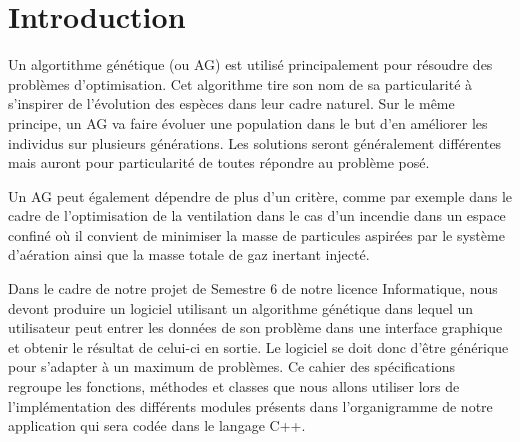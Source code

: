 \documentclass[a4paper,11pt]{article}
\title{\vspace{13em}{\huge Cahier des Spécifications}}
\author{Edouard Fouassier - Maxime Gonthier - Benjamin Guillot\\
		Laureline Martin - Rémi Navarro - Lydia Rodrigez de la Nava
		\vspace{2em}\\
		Algorithme Génétique
		\vspace{2em}}
\begin{document}
	
	\clearpage
	\maketitle\vspace{13em}
\newpage
\tableofcontents
\newpage\clearpage{}
	
	\section{Introduction}
		Un algortithme génétique (ou AG) est utilisé principalement pour résoudre des problèmes d’optimisation. 
		Cet algorithme tire son nom de sa particularité à s’inspirer de l’évolution des espèces dans leur cadre naturel.
		Sur le même principe, un AG va faire évoluer une population dans le but d’en améliorer les individus sur plusieurs générations.
		Les solutions seront généralement différentes mais auront pour particularité de toutes répondre au problème posé.

		Un AG peut également dépendre de plus d'un critère, comme par exemple dans le cadre de l'optimisation de la ventilation dans le cas d’un incendie dans un espace confiné où il convient de minimiser la masse de particules aspirées par le système d'aération ainsi que la masse totale de gaz inertant injecté.

		Dans le cadre de notre projet de Semestre 6 de notre licence Informatique, nous devont produire un logiciel utilisant un algorithme génétique dans lequel un utilisateur peut entrer les données de son problème dans une interface graphique et obtenir le résultat de celui-ci en sortie. Le logiciel se doit donc d'être générique pour s'adapter à un maximum de problèmes.
		Ce cahier des spécifications regroupe les fonctions, méthodes et classes que nous allons utiliser lors de l’implémentation des différents modules présents dans l'organigramme de notre application qui sera codée dans le langage C++.
\end{document}
